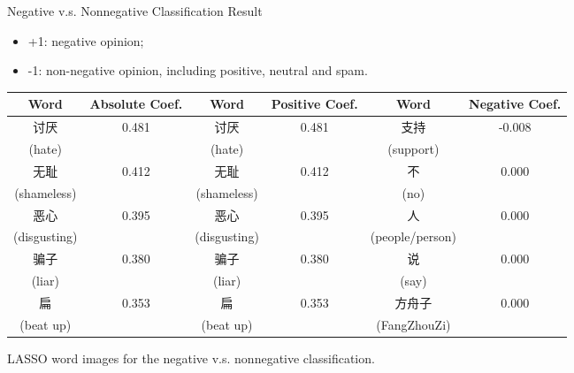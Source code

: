 \documentclass[12pt]{beamer}
\newcommand{\1}[1]{{\mathbf 1}\left\{#1\right\}}        %
\begin{document}
\begin{frame}{Negative v.s. Nonnegative Classification Result}
\begin{itemize}[<+->]
\item +1: negative opinion;
\item -1: non-negative opinion, including positive, neutral and spam.
\end{itemize}

\tiny
\begin{center}
\begin{tabular}{|c|c||c|c||c|c|}
\hline
Word & Absolute Coef. & Word & Positive Coef. & Word & Negative Coef.\\ \hline \hline
讨厌 & 0.481 & 讨厌 & 0.481 & 支持 & -0.008\\
(hate) & & (hate) & & (support) & \\\hline
无耻 & 0.412 & 无耻 & 0.412 & 不 & 0.000\\
(shameless) & & (shameless) & & (no) & \\\hline
恶心 & 0.395 & 恶心 & 0.395 & 人 & 0.000\\
(disgusting) & & (disgusting) & & (people/person) & \\\hline
骗子 & 0.380 & 骗子 & 0.380 & 说 & 0.000\\
(liar) & & (liar) & & (say) & \\\hline
扁 & 0.353 & 扁 & 0.353 & 方舟子 & 0.000\\
(beat up) & & (beat up) & & (FangZhouZi) & \\\hline
\end{tabular}
LASSO word images for the negative v.s. nonnegative classification.
\end{center}

\end{frame}


\end{document}

